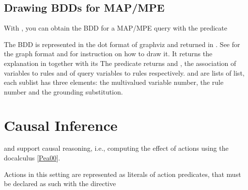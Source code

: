 \documentclass[letterpaper,10pt,english]{sphinxmanual}
\begin{document}
\subsection{Drawing BDDs for MAP/MPE}
\label{\detokenize{index:drawing-bdds-for-map-mpe}}
\sphinxAtStartPar
With , you can obtain the BDD for a MAP/MPE query with the predicate

\begin{sphinxVerbatim}[commandchars=\\\{\}]
          
\end{sphinxVerbatim}

\sphinxAtStartPar
The BDD is represented in the dot format of graphviz and returned in . See {\hyperref[\detokenize{index:drawing-bdds}]{}}
for the graph format and for instruction on how to draw it.
It returns the explanation in  together with its 
The predicate returns  and , the association of variables to rules
and of query variables to rules respectively.
 and  are lists of list, each sublist has three elements:
the multivalued variable number,
the rule number and the grounding substitution.


\section{Causal Inference}
\label{\detokenize{index:causal-inference}}
\sphinxAtStartPar
{} and  support causal reasoning, i.e., computing the effect of actions using the do\sphinxhyphen{}calculus {[}\hyperlink{cite.index:id58}{Pea00}{]}.

\sphinxAtStartPar
Actions in this setting are represented as literals of action predicates, that must be declared as such with the directive
\end{document}

